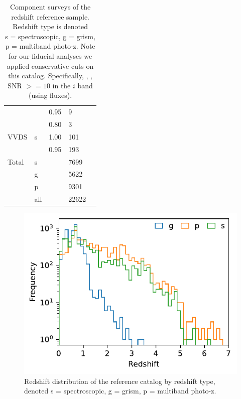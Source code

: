 \begin{table}[!p]
\begin{tabular}{lllll}
             &   & 0.95 & 9 & \\
             &   & 0.80 & 3 & \\
        VVDS & s & 1.00 & 101 & \citet{lefevre2013} \\
             &   & 0.95 & 193 & \\
        \hline
        Total & s & & 7699 & \\
              & g & & 5622 & \\
              & p & & 9301 & \\
              & all & & 22622 & \\
        \hline
    \end{tabular}
    \caption{
        Component surveys of the redshift reference sample.
        Redshift type is denoted\\ s = spectroscopic, g = grism, p = multiband photo-z.
        Note for our fiducial analyses we applied conservative cuts on this catalog.
        Specifically, , , SNR $>= 10$ in the $i$ band (using  fluxes).
    }
    \label{tab:reference-sample}
\end{table}

\begin{figure}
    \centering
    \includegraphics{figures/redshift_distribution_by_type.pdf}
    \caption{
        Redshift distribution of the reference catalog by redshift type, denoted s = spectroscopic, g = grism, p = multiband photo-z.
    }
    \label{fig:redshift-by-type}
\end{figure}



